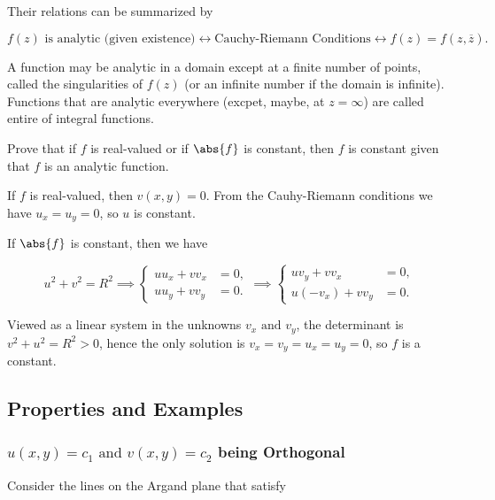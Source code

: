 \documentclass[english,a4paper,12pt]{report}
\begin{document}
Their relations can be summarized by 

\begin{equation}
    f(z) \text{ is analytic (given existence)} \longleftrightarrow \text{Cauchy-Riemann Conditions} \longleftrightarrow f(z) = f(z,\overline{z} ).
\end{equation}

A function may be analytic in a domain except at a finite number of points, called the singularities of \(f(z)\) (or an infinite number if the domain is infinite). Functions that are analytic everywhere (excpet, maybe, at \(z = \infty\)) are called entire of integral functions.

{Prove that if \(f\) is real-valued or if \(\abs{f} \) is constant, then \(f\) is constant given that \(f\) is an analytic function.}
{If \(f\) is real-valued, then \(v(x,y) = 0\). From the Cauhy-Riemann conditions we have \(u_{x} = u_{y} = 0  \), so \(u\) is constant. 

If \(\abs{f} \) is constant, then we have 

\begin{equation}
    u^2+v^2=R^2 \implies \begin{cases}
        u u_{x}+v v_{x} &=0,\\
        u u_{y} + v v_{y} &= 0.
    \end{cases} \implies 
    \begin{cases}
        uv_{y}+v v_{x} &=0,\\
        u(-v_{x} )+v v_{y} &=0 .
    \end{cases}  
\end{equation}

Viewed as a linear system in the unknowns \(v_{x}\text { and } v_{y}  \), the determinant is \(v^2+u^2=R^2 > 0\), hence the only solution is \(v_{x}=v_{y}=u_{x}=u_{y}=0   \), so \(f\) is a constant.   
} 


\subsection{Properties and Examples}

\subsubsection{\(u(x,y) = c_1 \text { and } v(x,y) = c_2 \) being Orthogonal}

Consider the lines on the Argand plane that satisfy 
\end{document}
